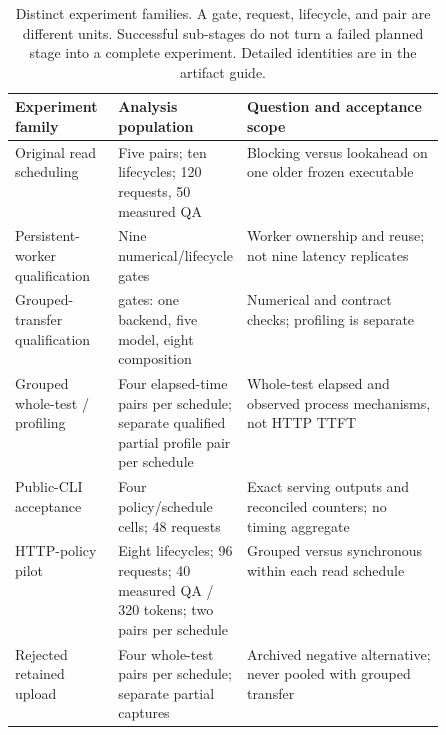 \begin{table}[!htbp]
\centering
\small
\begin{tabularx}{\linewidth}{@{}>{\raggedright\arraybackslash}p{0.24\linewidth}>{\raggedright\arraybackslash}p{0.26\linewidth}>{\raggedright\arraybackslash}X@{}}
\toprule
Experiment family & Analysis population & Question and acceptance scope \\
\midrule
Original read scheduling & Five pairs; ten lifecycles; 120 requests, 50 measured QA & Blocking versus lookahead on one older frozen executable \\
Persistent-worker qualification & Nine numerical/lifecycle gates & Worker ownership and reuse; not nine latency replicates \\
Grouped-transfer qualification & 14 gates: one backend, five model, eight composition & Numerical and contract checks; profiling is separate \\
Grouped whole-test / profiling & Four elapsed-time pairs per schedule; separate qualified partial profile pair per schedule & Whole-test elapsed and observed process mechanisms, not HTTP TTFT \\
Public-CLI acceptance & Four policy/schedule cells; 48 requests & Exact serving outputs and reconciled counters; no timing aggregate \\
HTTP-policy pilot & Eight lifecycles; 96 requests; 40 measured QA / 320 tokens; two pairs per schedule & Grouped versus synchronous within each read schedule \\
Rejected retained upload & Four whole-test pairs per schedule; separate partial captures & Archived negative alternative; never pooled with grouped transfer \\
\bottomrule
\end{tabularx}
\caption{Distinct experiment families. A gate, request, lifecycle, and pair are
different units. Successful sub-stages do not turn a failed planned stage
into a complete experiment. Detailed identities are in the artifact guide.}
\label{tab:experiment-families}
\end{table}

